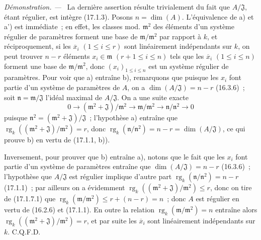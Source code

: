 \documentclass[10pt,oneside]{book}
\newcommand{\oldpage}[2][]{%
  \setcounter{footnote}{0}%
  \marginpar{\scriptsize\textbf{#1}~|~#2}\ignorespaces}
\newenvironment{proof}{%
  \par\medskip\noindent\textit{Démonstration. ---\ }}{\par}
\begin{document}
\begin{proof}
La dernière assertion résulte trivialement du fait que $A/\mathfrak{J}$,
étant régulier, est intègre (17.1.3). Posons $n=\dim(A)$. L'équivalence de a)
et a') est immédiate~; en effet, les classes mod. $\mathfrak{m}^2$ des éléments
d'un système régulier de paramètres forment une base de
$\mathfrak{m}/\mathfrak{m}^2$ par rapport à $k$, et réciproquement, si les
$\overline{x}_i$ $(1\leq i\leq r)$ sont linéairement indépendants sur $k$, on
peut trouver $n-r$ éléments $x_i\in\mathfrak{m}$ $(r+1\leq i\leq n)$ tels que
les $\overline{x}_i$ $(1\leq i\leq n)$ forment une base de
$\mathfrak{m}/\mathfrak{m}^2$, donc $(x_i)_{1\leq i\leq n}$ est un système
régulier de paramètres. Pour voir que a) entraîne b), remarquons que puisque
les $x_i$ font partie d'un système de paramètres de $A$, on a
$\dim(A/\mathfrak{J})=n-r$ (16.3.6)~; soit
$\mathfrak{n}=\mathfrak{m}/\mathfrak{J}$ l'idéal maximal de
$A/\mathfrak{J}$. On a une suite exacte
\begin{equation}
\label{0.17.1.7.1-fr}
\tag{17.1.7.1}
  0\longrightarrow(\mathfrak{m}^2+\mathfrak{J})/\mathfrak{m}^2
  \longrightarrow\mathfrak{m}/\mathfrak{m}^2
  \longrightarrow\mathfrak{n}/\mathfrak{n}^2\longrightarrow0
\end{equation}
puisque $\mathfrak{n}^2=(\mathfrak{m}^2+\mathfrak{J})/\mathfrak{J}$~;
l'hypothèse a) entraîne que
$\operatorname{rg}_k((\mathfrak{m}^2+\mathfrak{J})/\mathfrak{m}^2)=r$, donc
$\operatorname{rg}_k(\mathfrak{n}/\mathfrak{n}^2)=n-r
=\dim(A/\mathfrak{J})$, ce qui prouve b) en vertu de (17.1.1, b)).

Inversement, pour prouver que b) entraîne a), notons que le fait que les $x_i$
font partie d'un système de paramètres entraîne que
$\dim(A/\mathfrak{J})=n-r$ (16.3.6)~; l'hypothèse que $A/\mathfrak{J}$ est
régulier implique d'autre part
$\operatorname{rg}_k(\mathfrak{n}/\mathfrak{n}^2)=n-r$ (17.1.1)~; par ailleurs
on a évidemment
$\operatorname{rg}_k((\mathfrak{m}^2+\mathfrak{J})/\mathfrak{m}^2)\leq r$,
donc on tire de (17.1.7.1) que
$\operatorname{rg}_k(\mathfrak{m}/\mathfrak{m}^2)\leq r+(n-r)=n$~; donc $A$
est régulier en vertu de (16.2.6) et (17.1.1). En outre la relation
$\operatorname{rg}_k(\mathfrak{m}/\mathfrak{m}^2)=n$ entraîne alors
$\operatorname{rg}_k((\mathfrak{m}^2+\mathfrak{J})/\mathfrak{m}^2)=r$, et par
suite les $\overline{x}_i$ sont linéairement indépendants sur $k$. C.Q.F.D.
\end{proof}

\oldpage[0\textsubscript{IV-1}]{42}
\end{document}
